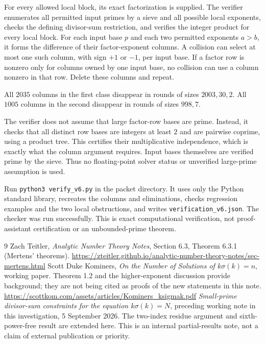 \documentclass[11pt]{article}
\begin{document}
For every allowed local block, its exact factorization is supplied. The verifier enumerates all permitted input primes by a sieve and all possible local exponents, checks the defining divisor-sum restriction, and verifies the integer product for every local block. For each input base $p$ and each two permitted exponents $a>b$, it forms the difference of their factor-exponent columns. A collision can select at most one such column, with sign $+1$ or $-1$, per input base. If a factor row is nonzero only for columns owned by one input base, no collision can use a column nonzero in that row. Delete these columns and repeat.

All $2035$ columns in the first class disappear in rounds of sizes $2003,30,2$. All $1005$ columns in the second disappear in rounds of sizes $998,7$.

The verifier does not assume that large factor-row bases are prime. Instead, it checks that all distinct row bases are integers at least $2$ and are pairwise coprime, using a product tree. This certifies their multiplicative independence, which is exactly what the column argument requires. Input bases themselves are verified prime by the sieve. Thus no floating-point solver status or unverified large-prime assumption is used.

Run \texttt{python3 verify\_v6.py} in the packet directory. It uses only the Python standard library, recreates the columns and eliminations, checks regression examples and the two local obstructions, and writes \texttt{verification\_v6.json}. The checker was run successfully. This is exact computational verification, not proof-assistant certification or an unbounded-prime theorem.

\clearpage
\begin{thebibliography}{9}
 Zach Teitler, \emph{Analytic Number Theory Notes}, Section 6.3, Theorem 6.3.1 (Mertens' theorems).\newline
\url{https://zteitler.github.io/analytic-number-theory-notes/sec-mertens.html}
 Scott Duke Kominers, \emph{On the Number of Solutions of $k\sigma(k)=n$}, working paper. Theorem 1.2 and the higher-exponent discussion provide background; they are not being cited as proofs of the new statements in this note.\newline
\url{https://scottkom.com/assets/articles/Kominers_ksigmak.pdf}
 \emph{Small-prime divisor-sum constraints for the equation $k\sigma(k)=N$}, preceding working note in this investigation, 5 September 2026. The two-index residue argument and sixth-power-free result are extended here. This is an internal partial-results note, not a claim of external publication or priority.
\end{thebibliography}
\end{document}
